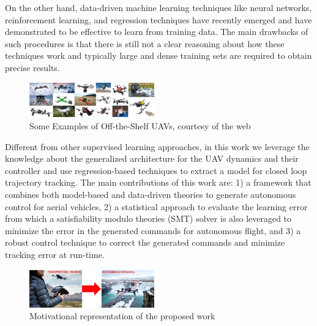 \documentclass[letterpaper, 10 pt, conference]{ieeeconf}  %
\newcommand\NB[1]{$\spadesuit$\footnote{NB: #1}}
\begin{document}
On the other hand, data-driven machine learning techniques like neural networks, reinforcement learning, and regression techniques have recently emerged and have demonstrated to be effective to learn from training data. The main drawbacks of such procedures is that there is still not a clear reasoning about how these techniques work and typically large and dense training sets are required to obtain precise results.
\begin{figure}[t]
    \includegraphics[width=0.48\textwidth]{images/quads.png}
    \vspace{-5pt}
    \caption{Some Examples of Off-the-Shelf UAVs, courtesy of the web}
    \label{fig:uavs}
    \vspace{-15pt}
\end{figure}

Different from other supervised learning approaches, in this work we leverage the knowledge about the generalized architecture for the UAV dynamics and their controller and use regression-based techniques to extract a model for closed loop trajectory tracking. The main contributions of this work are: 1) a framework that combines both model-based and data-driven theories to generate autonomous control for aerial vehicles, 2) a statistical approach to evaluate the learning error from which a satisfiability modulo theories (SMT) solver is also leveraged to minimize the error in the generated commands for autonomous flight, and 3) a robust control technique to correct the generated commands and minimize tracking error at run-time.

\begin{figure}[b]
    \vspace{-10pt}
    \includegraphics[width=0.48\textwidth]{images/motivation2.png}
    \vspace{-5pt}
    \caption{Motivational representation of the proposed work}
    \label{fig:motiv}
    \vspace{-15pt}
\end{figure}
\end{document}
